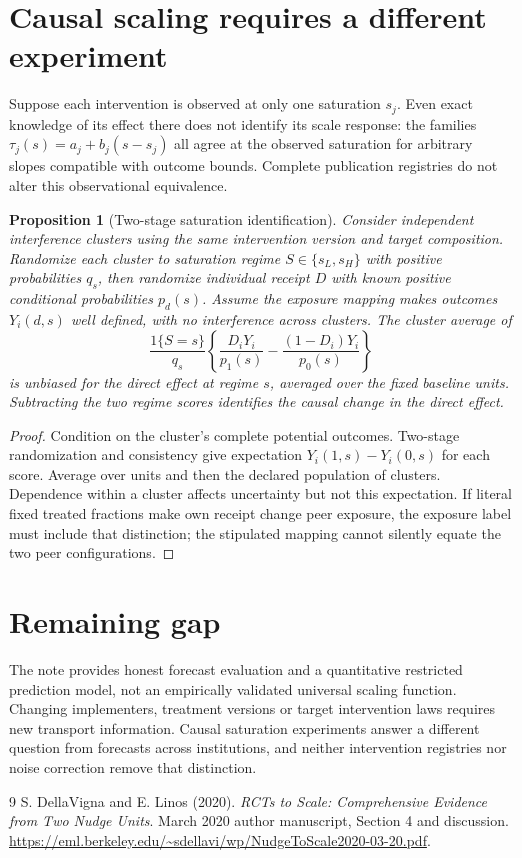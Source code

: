 \documentclass[11pt]{article}
\newtheorem{proposition}[theorem]{Proposition}
\theoremstyle{remark}
\begin{document}
\section*{Causal scaling requires a different experiment}
Suppose each intervention is observed at only one saturation $s_j$. Even exact knowledge of its effect there does not identify its scale response: the families
$\tau_j(s)=a_j+b_j(s-s_j)$ all agree at the observed saturation for arbitrary slopes compatible with outcome bounds. Complete publication registries do not alter this observational equivalence.

\begin{proposition}[Two-stage saturation identification]
Consider independent interference clusters using the same intervention version and target composition. Randomize each cluster to saturation regime $S\in\{s_L,s_H\}$ with positive probabilities $q_s$, then randomize individual receipt $D$ with known positive conditional probabilities $p_d(s)$. Assume the exposure mapping makes outcomes $Y_i(d,s)$ well defined, with no interference across clusters. The cluster average of
\[
 \frac{1\{S=s\}}{q_s}
 \left\{\frac{D_iY_i}{p_1(s)}-\frac{(1-D_i)Y_i}{p_0(s)}\right\}
\]
is unbiased for the direct effect at regime $s$, averaged over the fixed baseline units. Subtracting the two regime scores identifies the causal change in the direct effect.
\end{proposition}
\begin{proof}
Condition on the cluster's complete potential outcomes. Two-stage randomization and consistency give expectation $Y_i(1,s)-Y_i(0,s)$ for each score. Average over units and then the declared population of clusters. Dependence within a cluster affects uncertainty but not this expectation. If literal fixed treated fractions make own receipt change peer exposure, the exposure label must include that distinction; the stipulated mapping cannot silently equate the two peer configurations.
\end{proof}

\section*{Remaining gap}
The note provides honest forecast evaluation and a quantitative restricted prediction model, not an empirically validated universal scaling function. Changing implementers, treatment versions or target intervention laws requires new transport information. Causal saturation experiments answer a different question from forecasts across institutions, and neither intervention registries nor noise correction remove that distinction.

\begin{thebibliography}{9}
 S. DellaVigna and E. Linos (2020). \emph{RCTs to Scale: Comprehensive Evidence from Two Nudge Units}. March 2020 author manuscript, Section 4 and discussion. \url{https://eml.berkeley.edu/~sdellavi/wp/NudgeToScale2020-03-20.pdf}.
\end{thebibliography}
\end{document}
